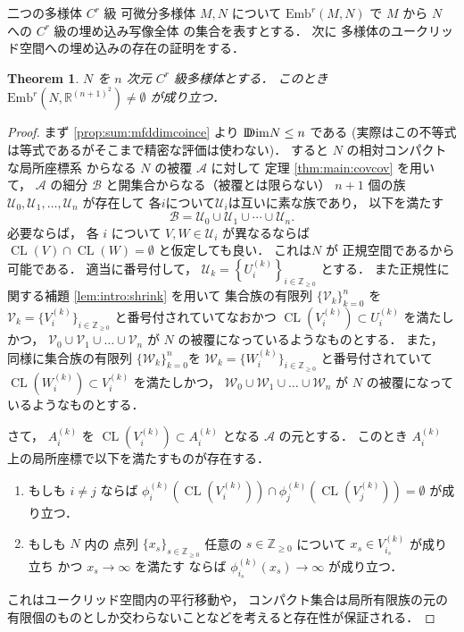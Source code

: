 \documentclass[leqno, a4paper, 12pt]{jsarticle}
\theoremstyle{plain}
\newtheorem{thm}{Theorem}[section]
\theoremstyle{definition}
\theoremstyle{remark}
\newcommand{\zz}{\mathbb{Z}}
\newcommand{\rr}{\mathbb{R}}
\DeclareMathOperator{\cl}{\mathrm{CL}}
\newcommand{\yoddim}{\mathrm{D\hspace{-5.5pt}Dim}}
\newcommand{\yocovf}[1]{\mathscr{#1}}
\newcommand{\yoembsym}{\mathrm{Emb}}
\numberwithin{equation}{section}
\begin{document}
二つの多様体
$C^{r}$
級
可微分多様体
$M, N$
について
$\yoembsym^{r}\left(M, N\right)$
で
$M$
から
$N$
への
$C^{r}$
級の埋め込み写像全体
の集合を表すとする．
次に
多様体のユークリッド空間への埋め込みの存在の証明をする．
\begin{thm}\label{thm:sum:whineyembedjigen}
$N$
を
$n$
次元
$C^r$
級多様体とする．
このとき
$\yoembsym^{r}\left(N, \rr^{(n+1)^2}\right)\neq \emptyset$
が成り立つ．
\end{thm}
\begin{proof}
まず
\ref{prop:sum:mfddimcoince}
より
$\yoddim N\le n$
である
(実際はこの不等式は等式であるがそこまで精密な評価は使わない)．
すると
$N$
の相対コンパクトな局所座標系
からなる
$N$
の被覆
$\yocovf{A}$
に対して
定理
\ref{thm:main:covcov}
を用いて，
$\yocovf{A}$
の細分
$\yocovf{B}$
と開集合からなる（被覆とは限らない）
$n+1$
個の族
$\yocovf{U}_{0},
\yocovf{U}_{1},
\dots,
\yocovf{U}_{n}$
が存在して
各$i$について$\yocovf{U}_{i}$は互いに素な族であり，
以下を満たす
\[
\yocovf{B}=\yocovf{U}_{0}\cup
\yocovf{U}_{1}\cup\cdots\cup\yocovf{U}_{n}. 
\]
必要ならば，
各
$i$
について
$V, W\in \yocovf{U}_{i}$
が異なるならば
$\cl(V)\cap \cl(W)=\emptyset$
と仮定しても良い．
これは$N$
が
正規空間であるから可能である．
適当に番号付して，
$\yocovf{U}_{k}=\left\{U_{i}^{(k)}\right\}_{i\in \zz_{\ge 0}}$
とする．
また正規性に関する補題
\ref{lem:intro:shrink}
を用いて
集合族の有限列
$\{\yocovf{V}_k\}_{k=0}^{n}$
を
$\yocovf{V}_{k}=\{V_{i}^{(k)}\}_{i\in \zz_{\ge 0}}$
と番号付されていてなおかつ
$\cl\left(V_{i}^{(k)}\right)\subset U_{i}^{(k)}$
を満たしかつ，
$\yocovf{V}_{0}\cup \yocovf{V}_{1}\cup \dots \cup \yocovf{V}_{n}$
が
$N$
の被覆になっているようなものとする．
また，
同様に集合族の有限列
$\{\yocovf{W}_{k}\}_{k=0}^{n}$を
$\yocovf{W}_{k}=\{W_{i}^{(k)}\}_{i\in \zz_{\ge 0}}$
と番号付されていて
$\cl\left(W_{i}^{(k)}\right)\subset V_{i}^{(k)}$
を満たしかつ，
$\yocovf{W}_{0}\cup \yocovf{W}_{1}\cup 
 \dots \cup \yocovf{W}_{n}$
 が
 $N$
 の被覆になっているようなものとする．

さて，
$A_{i}^{(k)}$
を
$\cl(V_{i}^{(k)})\subset A_{i}^{(k)}$
となる
$\yocovf{A}$
の元とする．
このとき
$A_{i}^{(k)}$
上の局所座標で以下を満たすものが存在する．
\begin{enumerate}[label=\textup{(\arabic*)}]
\item 
もしも
$i\neq j$
ならば
$\phi_{i}^{(k)}(\cl(V_{i}^{(k)}))\cap \phi_{j}^{(k)}(\cl(V_{j}^{(k)}))=\emptyset$
が成り立つ．
\item 
もしも
$N$
内の
点列
$\{x_{s}\}_{s\in \zz_{\ge 0}}$
任意の
$s\in \zz_{\ge 0}$
について
$x_{s}\in V_{i_{s}}^{(k)}$
が成り立ち
かつ
$x_{s}\to \infty$
を満たす
ならば
$\phi_{i_{s}}^{(k)}(x_{s})\to \infty$
が成り立つ．
\end{enumerate}
これはユークリッド空間内の平行移動や，
コンパクト集合は局所有限族の元の有限個のものとしか交わらないことなどを考えると存在性が保証される．


\end{proof}
\end{document}
